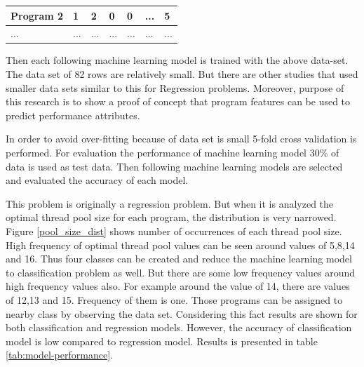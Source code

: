 \begin{table}[]
\begin{tabular}{|l|l|l|l|l|l|l|}
		Program 2                         & 1                                                                            & 2                                                                        & 0                                                                      & 0                                                                                               & ...                                                                  & 5                                                                               \\ \hline
		...                               & ...                                                                          & ...                                                                      & ...                                                                    & ...                                                                                             & ...                                                                  & ...                                                                             \\ \hline
	\end{tabular}
\end{table}

Then each following machine learning model is trained with the above data-set. The data set of 82 rows are relatively small. But there are other studies \cite{7459644,ahmed2015using} that used smaller data sets similar to this for Regression problems. Moreover, purpose of this research is to show a proof of concept that program features can be used to predict performance attributes.  

 In order to avoid over-fitting because of data set is small 5-fold cross validation is performed. For evaluation the performance of machine learning model 30\% of data is used as test data. Then following machine learning models are selected and evaluated the accuracy of each model.

This problem is originally a regression problem. But when it is analyzed the optimal thread pool size for each program, the distribution is very narrowed. Figure \ref{pool_size_dist} shows number of occurrences of each thread pool size. High frequency of optimal thread pool values can be seen around values of 5,8,14 and 16. Thus four classes can be created and reduce the machine learning model to classification problem as well. But there are some low frequency values around high frequency values also. For example around the value of 14, there are values of 12,13 and 15. Frequency of them is one. Those programs can be assigned to nearby class by observing the data set. Considering this fact results are shown for both classification and regression models. However, the accuracy of classification model is low compared to regression model. Results is presented in table \ref{tab:model-performance}.

